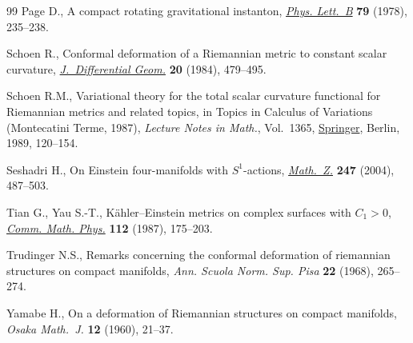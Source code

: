 \documentclass[pdftex]{sigma}
\numberwithin{equation}{section}
\begin{document}
\begin{thebibliography}{99}
Page D., A compact rotating gravitational instanton, \href{https://doi.org/10.1016/0370-2693(78)90231-9}{\textit{Phys. Lett.~B}}
 \textbf{79} (1978), 235--238.

Schoen R., Conformal deformation of a {R}iemannian metric to constant scalar
 curvature, \href{https://doi.org/10.4310/jdg/1214439291}{\textit{J.~Differential Geom.}} \textbf{20} (1984), 479--495.

Schoen R.M., Variational theory for the total scalar curvature functional for
 {R}iemannian metrics and related topics, in Topics in Calculus of Variations
 ({M}ontecatini {T}erme, 1987), \textit{Lecture Notes in Math.}, Vol.~1365,
 \href{https://doi.org/10.1007/BFb0089180}{Springer}, Berlin, 1989, 120--154.

Seshadri H., On {E}instein four-manifolds with {$S^1$}-actions,
 \href{https://doi.org/10.1007/s00209-003-0557-4}{\textit{Math.~Z.}} \textbf{247} (2004), 487--503.

Tian G., Yau S.-T., K\"ahler--{E}instein metrics on complex surfaces with
 {$C_1>0$}, \href{https://doi.org/10.1007/BF01217685}{\textit{Comm. Math. Phys.}} \textbf{112} (1987), 175--203.

Trudinger N.S., Remarks concerning the conformal deformation of riemannian
 structures on compact manifolds, \textit{Ann. Scuola Norm. Sup. Pisa}
 \textbf{22} (1968), 265--274.

Yamabe H., On a deformation of {R}iemannian structures on compact manifolds,
 \textit{Osaka Math.~J.} \textbf{12} (1960), 21--37.

\end{thebibliography}\LastPageEnding
\end{document}
